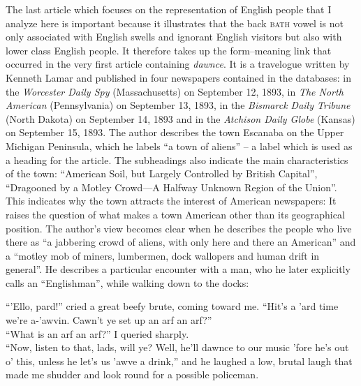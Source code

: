 The last article which focuses on the representation of English people that I analyze here is important because it illustrates that the back \textsc{bath} vowel is not only associated with English swells and ignorant English visitors but also with lower class English people. It therefore takes up the form–meaning link that occurred in the very first article containing \emph{dawnce}. It is a travelogue written by Kenneth Lamar and published in four newspapers contained in the databases: in the \emph{Worcester Daily Spy} (Massachusetts) on September 12, 1893,
in \emph{The North American} (Pennsylvania) on September 13, 1893,
in the \emph{Bismarck Daily Tribune} (North Dakota) on September 14, 1893
and in the \emph{Atchison Daily Globe} (Kansas) on September 15, 1893. The author describes the town Escanaba on the Upper Michigan Peninsula, which he labels “a town of aliens” – a label which is used as a heading for the article. The subheadings also indicate the main characteristics of the town: “American Soil, but Largely Controlled by British Capital”, “Dragooned by a Motley Crowd—A Halfway Unknown Region of the Union”. This indicates why the town attracts the interest of American newspapers: It raises the question of what makes a town American other than its geographical position. The author’s view becomes clear when he describes the people who live there as “a jabbering crowd of aliens, with only here and there an American” and a “motley mob of miners, lumbermen, dock wallopers and human drift in general”. He describes a particular encounter with a man, who he later explicitly calls an “Englishman”, while walking down to the docks:

\begin{ipquote}
“’Ello, pard!” cried a great beefy brute, coming toward me. “Hit’s a ’ard time we’re a-’awvin. Cawn’t ye set up an arf an arf?”\\
“What is an arf an arf?” I queried sharply.\\
“Now, listen to that, lads, will ye? Well, he’ll dawnce to our music ’fore he’s out o’ this, unless he let’s us ’awve a drink,” and he laughed a low, brutal laugh that made me shudder and look round for a possible policeman.
\end{ipquote}


